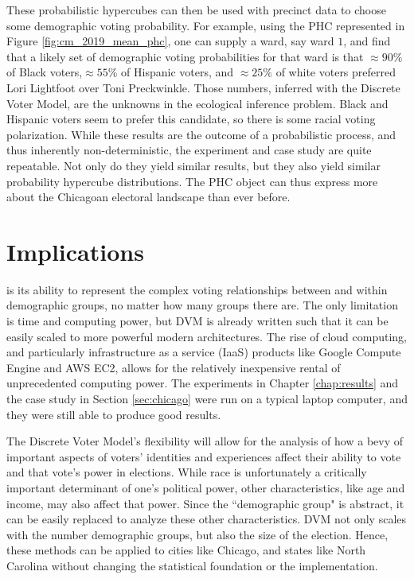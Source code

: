 These probabilistic hypercubes can then be used with precinct data to choose some demographic voting probability. For example, using the PHC represented in Figure \ref{fig:cm_2019_mean_phc}, one can supply a ward, say ward $1$, and find that a likely set of demographic voting probabilities for that ward is that $\approx 90\%$ of Black voters,$\approx 55\%$ of Hispanic voters, and $\approx 25\%$ of white voters preferred Lori Lightfoot over Toni Preckwinkle. Those numbers, inferred with the Discrete Voter Model, are the unknowns in the ecological inference problem. Black and Hispanic voters seem to prefer this candidate, so there is some racial voting polarization. While these results are the outcome of a probabilistic process, and thus inherently non-deterministic, the experiment and case study are quite repeatable. Not only do they yield similar results, but they also yield similar probability hypercube distributions. The PHC object can thus express more about the Chicagoan electoral landscape than ever before.


\section{Implications}

 is its ability to represent the complex voting relationships between and within demographic groups, no matter how many groups there are. The only limitation is time and computing power, but DVM is already written such that it can be easily scaled to more powerful modern architectures. The rise of cloud computing, and particularly infrastructure as a service (IaaS) products like Google Compute Engine and AWS EC2, allows for the relatively inexpensive rental of unprecedented computing power. The experiments in Chapter \ref{chap:results} and the case study in Section \ref{sec:chicago} were run on a typical laptop computer, and they were still able to produce good results.

The Discrete Voter Model's flexibility will allow for the analysis of how a bevy of important aspects of voters' identities and experiences affect their ability to vote and that vote's power in elections. While race is unfortunately a critically important determinant of one's political power, other characteristics, like age and income, may also affect that power. Since the ``demographic group" is abstract, it can be easily replaced to analyze these other characteristics. DVM not only scales with the number demographic groups, but also the size of the election. Hence, these methods can be applied to cities like Chicago, and states like North Carolina without changing the statistical foundation or the implementation.


